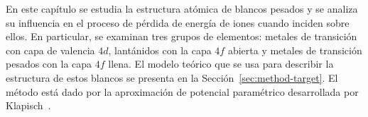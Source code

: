 En este capítulo se estudia la estructura atómica de blancos pesados 
y se analiza su influencia en el proceso de pérdida de energía de iones 
cuando inciden sobre ellos. 
En particular, se examinan tres grupos de elementos: metales de 
transición con capa de valencia $4d$, lantánidos con la capa $4f$ 
abierta y metales de transición pesados con la capa $4f$ llena. 
El modelo teórico que se usa para describir la estructura de estos 
blancos se presenta en la Sección~\ref{sec:method-target}. El método 
está dado por la aproximación de potencial paramétrico desarrollada por 
Klapisch~\cite{Klapisch:77,Klapisch:67,Klapisch:71,BarShalom:01}. 

